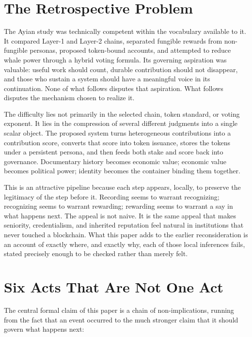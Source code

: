 \documentclass[11pt,oneside]{article}
\theoremstyle{plain}
\theoremstyle{definition}
\begin{document}
\clearpage
\tableofcontents
\clearpage
{}
\bigskip

\section{The Retrospective Problem}

The Ayian study was technically competent within the vocabulary available to it. It compared Layer-1 and Layer-2 chains, separated fungible rewards from non-fungible personas, proposed token-bound accounts, and attempted to reduce whale power through a hybrid voting formula. Its governing aspiration was valuable: useful work should count, durable contribution should not disappear, and those who sustain a system should have a meaningful voice in its continuation. None of what follows disputes that aspiration. What follows disputes the mechanism chosen to realize it.

The difficulty lies not primarily in the selected chain, token standard, or voting exponent. It lies in the compression of several different judgments into a single scalar object. The proposed system turns heterogeneous contributions into a contribution score, converts that score into token issuance, stores the tokens under a persistent persona, and then feeds both stake and score back into governance. Documentary history becomes economic value; economic value becomes political power; identity becomes the container binding them together.

This is an attractive pipeline because each step appears, locally, to preserve the legitimacy of the step before it. Recording seems to warrant recognizing; recognizing seems to warrant rewarding; rewarding seems to warrant a say in what happens next. The appeal is not naive. It is the same appeal that makes seniority, credentialism, and inherited reputation feel natural in institutions that never touched a blockchain. What this paper adds to the earlier reconsideration is an account of exactly where, and exactly why, each of those local inferences fails, stated precisely enough to be checked rather than merely felt.

\section{Six Acts That Are Not One Act}

The central formal claim of this paper is a chain of non-implications, running from the fact that an event occurred to the much stronger claim that it should govern what happens next:
\end{document}

